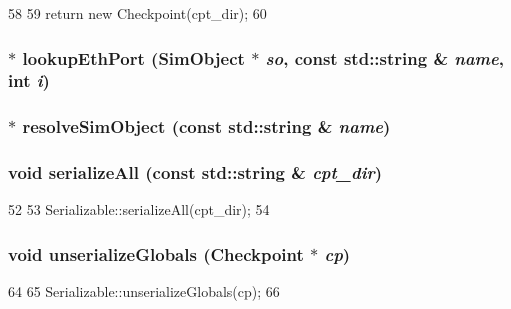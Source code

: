 \begin{DoxyCode}
58 {
59     return new Checkpoint(cpt_dir);
60 }
\end{DoxyCode}
\hypertarget{pyobject_8hh_a7140d9d13a7d38ed7ac6fe75319f64ca}{
\subsubsection[{lookupEthPort}]{$\ast$ lookupEthPort ({\bf SimObject} $\ast$ {\em so}, \/  const std::string \& {\em name}, \/  int {\em i})}}
\label{pyobject_8hh_a7140d9d13a7d38ed7ac6fe75319f64ca}
\hypertarget{pyobject_8hh_a86dd63b6a0431f583c8a984934c005ea}{
\subsubsection[{resolveSimObject}]{$\ast$ resolveSimObject (const std::string \& {\em name})}}
\label{pyobject_8hh_a86dd63b6a0431f583c8a984934c005ea}
\hypertarget{pyobject_8hh_a4d874e18d11647800fec682fd72a51db}{
\subsubsection[{serializeAll}]{\setlength{\rightskip}{0pt plus 5cm}void serializeAll (const std::string \& {\em cpt\_\-dir})}}
\label{pyobject_8hh_a4d874e18d11647800fec682fd72a51db}



\begin{DoxyCode}
52 {
53     Serializable::serializeAll(cpt_dir);
54 }
\end{DoxyCode}
\hypertarget{pyobject_8hh_a26aaa7facb37dfe9ef4c39b082978ef9}{
\subsubsection[{unserializeGlobals}]{\setlength{\rightskip}{0pt plus 5cm}void unserializeGlobals ({\bf Checkpoint} $\ast$ {\em cp})}}
\label{pyobject_8hh_a26aaa7facb37dfe9ef4c39b082978ef9}



\begin{DoxyCode}
64 {
65     Serializable::unserializeGlobals(cp);
66 }
\end{DoxyCode}
